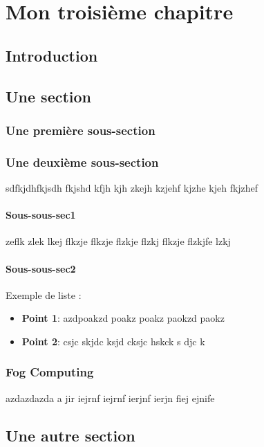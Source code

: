 \chapter{Mon troisième chapitre}
\section{Introduction}
\lipsum[1-1]%
\section{Une section}

\subsection{Une première sous-section}
\lipsum[1-1]%
\subsection{Une deuxième sous-section}
sdfkjdhfkjsdh fkjshd kfjh kjh zkejh kzjehf kjzhe kjeh fkjzhef

\subsubsection{Sous-sous-sec1}
zeflk zlek lkej flkzje flkzje flzkje flzkj flkzje flzkjfe lzkj
\subsubsection{Sous-sous-sec2}
Exemple de liste :

\begin{itemize}
	\item \textbf{Point 1}: azdpoakzd poakz poakz paokzd paokz 
	\item \textbf{Point 2}: csjc skjdc ksjd cksjc hskck s djc k
\end{itemize}
\subsection{Fog Computing}
azdazdazda a  jir iejrnf iejrnf ierjnf ierjn fiej ejnife
\section{Une autre section}
\lipsum[1-1] %